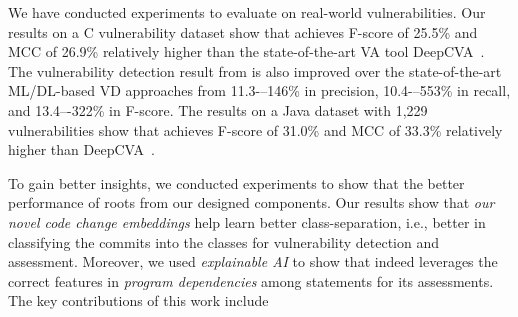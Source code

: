 

We have conducted experiments to evaluate {\tool} on real-world
vulnerabilities. Our results on a C vulnerability dataset
show that {\tool} achieves F-score of 25.5\% and MCC of 26.9\%
relatively higher than the state-of-the-art VA tool
DeepCVA~\cite{deepCVA-ase21}.  The vulnerability detection result from
{\tool} is also improved over the state-of-the-art ML/DL-based VD
approaches from 11.3-–146\% in precision, 10.4-–553\% in recall,
and 13.4–-322\% in F-score.
The results on a Java dataset with 1,229 vulnerabilities show that
{\tool} achieves F-score of 31.0\% and MCC of 33.3\% relatively higher
than DeepCVA~\cite{deepCVA-ase21}.


To gain better insights, we conducted experiments to show that the better
performance of {\tool} roots from our designed components.
Our results show that {\em our novel code change embeddings} help
{\tool} learn better class-separation, i.e., better in classifying the
commits into the classes for vulnerability detection and
assessment. Moreover, we used {\em explainable AI} to show
that {\tool} indeed leverages the correct features in {\em program
  dependencies} among statements for its assessments.
The key contributions of this work include

